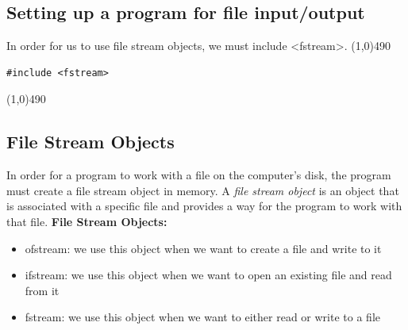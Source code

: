 \documentclass{report}
\begin{document}
    \subsection{Setting up a program for file input/output}
    \bigbreak \noindent 
    In order for us to use file stream objects, we must include <fstream>.
    \bigbreak \noindent 
    \line(1,0){490}
    \begin{verbatim}
#include <fstream>
    \end{verbatim}
    \line(1,0){490}
    \bigbreak \noindent 
    \subsection{File Stream Objects}
    \bigbreak \noindent 
    In order for a program to work with a file on the computer's disk, the program must create a file stream object in memory. A \textit{file stream object} is an object that is associated with a specific file and provides a way for the program to work with that file. 
    \bigbreak \noindent 
    \textbf{File Stream Objects:}
    \begin{itemize}
        \item ofstream: we use this object when we want to create a file and write to it
        \item ifstream: we use this object when we want to open an existing file and read from it
        \item fstream: we use this object when we want to either read or write to a file
    \end{itemize}

    \pagebreak \bigbreak \noindent 
\end{document}
